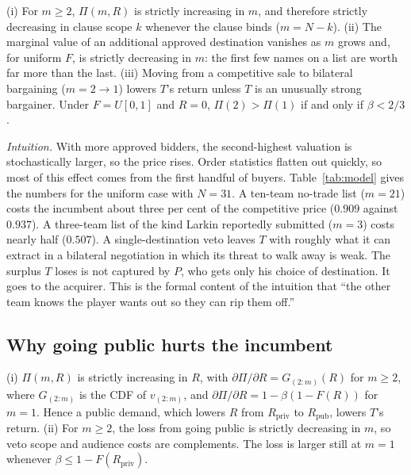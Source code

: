 \begin{proposition}\label{prop:veto}
(i) For $m\ge 2$, $\Pi(m,R)$ is strictly increasing in $m$, and therefore strictly decreasing in clause scope $k$ whenever the clause binds ($m=N-k$). (ii) The marginal value of an additional approved destination vanishes as $m$ grows and, for uniform $F$, is strictly decreasing in $m$: the first few names on a list are worth far more than the last. (iii) Moving from a competitive sale to bilateral bargaining ($m=2\to1$) lowers $T$'s return unless $T$ is an unusually strong bargainer. Under $F=U[0,1]$ and $R=0$, $\Pi(2)>\Pi(1)$ if and only if $\beta<2/3$.
\end{proposition}

\noindent\emph{Intuition.} With more approved bidders, the second-highest valuation is stochastically larger, so the price rises. Order statistics flatten out quickly, so most of this effect comes from the first handful of buyers. Table~\ref{tab:model} gives the numbers for the uniform case with $N=31$. A ten-team no-trade list ($m=21$) costs the incumbent about three per cent of the competitive price ($0.909$ against $0.937$). A three-team list of the kind Larkin reportedly submitted ($m=3$) costs nearly half ($0.507$). A single-destination veto leaves $T$ with roughly what it can extract in a bilateral negotiation in which its threat to walk away is weak. The surplus $T$ loses is not captured by $P$, who gets only his choice of destination. It goes to the acquirer. This is the formal content of the intuition that ``the other team knows the player wants out so they can rip them off.''

\subsection{Why going public hurts the incumbent}

\begin{proposition}\label{prop:audience}
(i) $\Pi(m,R)$ is strictly increasing in $R$, with $\partial\Pi/\partial R = G_{(2:m)}(R)$ for $m\ge2$, where $G_{(2:m)}$ is the CDF of $v_{(2:m)}$, and $\partial\Pi/\partial R=1-\beta(1-F(R))$ for $m=1$. Hence a public demand, which lowers $R$ from $R_{\text{priv}}$ to $R_{\text{pub}}$, lowers $T$'s return. (ii) For $m\ge2$, the loss from going public is strictly decreasing in $m$, so veto scope and audience costs are complements. The loss is larger still at $m=1$ whenever $\beta\le 1-F(R_{\text{priv}})$.
\end{proposition}

